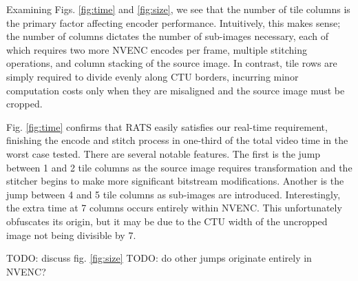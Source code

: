 Examining Figs. \ref{fig:time} and \ref{fig:size}, we see that the number of tile columns is the primary factor affecting encoder performance. Intuitively, this makes sense; the number of columns dictates the number of sub-images necessary, each of which requires two more NVENC encodes per frame, multiple stitching operations, and column stacking of the source image. In contrast, tile rows are simply required to divide evenly along CTU borders, incurring minor computation costs only when they are misaligned and the source image must be cropped.

Fig. \ref{fig:time} confirms that RATS easily satisfies our real-time requirement, finishing the encode and stitch process in one-third of the total video time in the worst case tested. There are several notable features. The first is the jump between 1 and 2 tile columns as the source image requires transformation and the stitcher begins to make more significant bitstream modifications. Another is the jump between 4 and 5 tile columns as sub-images are introduced. Interestingly, the extra time at 7 columns occurs entirely within NVENC. This unfortunately obfuscates its origin, but it may be due to the CTU width of the uncropped image not being divisible by 7.

TODO: discuss fig. \ref{fig:size}
TODO: do other jumps originate entirely in NVENC?






